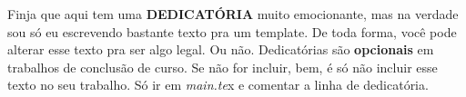 \begin{dedicatoria}
   \vspace*{\fill}
   \text
    Finja que aqui tem uma \textbf{DEDICATÓRIA} muito emocionante, mas na verdade sou só eu escrevendo bastante texto pra um template. De toda forma, você pode alterar esse texto pra ser algo legal. Ou não. Dedicatórias são \textbf{opcionais} em trabalhos de conclusão de curso. Se não for incluir, bem, é só não incluir esse texto no seu trabalho. Só ir em \textit{main.te}x e comentar a linha de dedicatória.

\end{dedicatoria}

